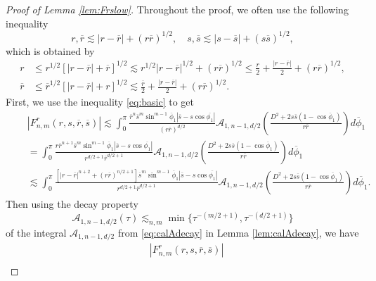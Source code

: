 \documentclass[11pt]{amsart}
\theoremstyle{definition}
\theoremstyle{remark}
\numberwithin{equation}{section}
\numberwithin{equation}{section}
\newcommand{\br}[1]{\overline{#1}}
\newcommand{\0}{\emptyset}
\newcommand{\calA}{\mathcal A}
\begin{document}
	\begin{proof}[Proof of Lemma \ref{lem:Frslow}]
		Throughout the proof, we often use the following inequality
		\begin{equation}\label{eq:basic}
			r, \br{r}\lesssim |r-\br{r}|+(r\br{r})^{1/2},\quad s, \br{s}\lesssim |s-\br{s}|+(s\br{s})^{1/2},
		\end{equation}
		which is obtained by
		\begin{equation}
			\begin{aligned}
				r&\leq r^{1/2}[|r-\br{r}|+\br{r}]^{1/2}\lesssim r^{1/2}|r-\br{r}|^{1/2}+(r\br{r})^{1/2}\leq \frac{r}{2}+\frac{|r-\br{r}|}{2}+(r\br{r})^{1/2},\\
				\br{r}&\leq \br{r}^{1/2}[|r-\br{r}|+r]^{1/2}\lesssim \frac{\br{r}}{2}+\frac{|r-\br{r}|}{2}+(r\br{r})^{1/2}.
			\end{aligned}
		\end{equation}
		First, we use the inequality \eqref{eq:basic} to get
		\begin{equation}
			\begin{aligned}
				&|F_{n,m}^{r}(r,s,\br{r},\br{s})|\lesssim \int_{0}^{\pi}\frac{\br{r}^{n}\br{s}^{m}\sin^{m-1}\br{\phi}_{1}|\br{s}-s\cos\br{\phi_{1}}|}{(r\br{r})^{d/2}}%
				\calA_{1,n-1,d/2}\left(\frac{D^{2}+2s\br{s}(1-\cos\br{\phi}_{1})}{r\br{r}}\right)d\br{\phi}_{1}\\
				\quad&=\int_{0}^{\pi}\frac{r\br{r}^{n+1}\br{s}^{m}\sin^{m-1}\br{\phi}_{1}|\br{s}-s\cos\br{\phi_{1}}|}{r^{d/2+1}\br{r}^{d/2+1}}\calA_{1,n-1,d/2}\left(\frac{D^{2}+2s\br{s}(1-\cos\br{\phi}_{1})}{r\br{r}}\right)d\br{\phi}_{1}\\
				\quad&\lesssim %
				\int_{0}^{\pi}\frac{[|r-\br{r}|^{n+2}+(r\br{r})^{n/2+1}]\br{s}^{m}\sin^{m-1}\br{\phi}_{1}|\br{s}-s\cos\br{\phi_{1}}|}{r^{d/2+1}\br{r}^{d/2+1}}\calA_{1,n-1,d/2}\left(\frac{D^{2}+2s\br{s}(1-\cos\br{\phi}_{1})}{r\br{r}}\right)d\br{\phi}_{1}.
			\end{aligned}
		\end{equation}
		Then using the decay property
		\begin{equation}
			\calA_{1,n-1,d/2}(\tau)\lesssim_{n,m} \min\{ \tau^{-(m/2+1)},\tau^{-(d/2+1)}\}
		\end{equation}
		of the integral $ \calA_{1,n-1,d/2} $ from \eqref{eq:calAdecay} in Lemma \ref{lem:calAdecay}, we have
		\begin{equation}
			\begin{aligned}
				&|F_{n,m}^{r}(r,s,\br{r},\br{s})|\\

\end{aligned}
\end{equation}
\end{proof}
\end{document}
